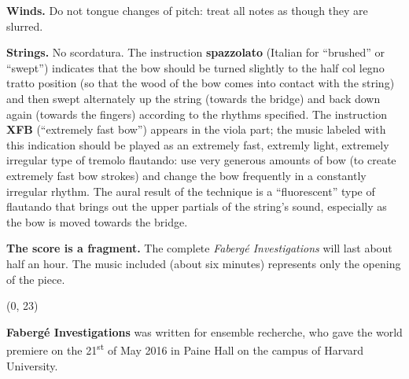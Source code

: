 \documentclass[10pt]{article}
\begin{document}
\begin{textblock}{23}
\textbf{Winds.} Do not tongue changes of pitch: treat all notes as though they
are slurred. 

\textbf{Strings.} No scordatura. The instruction \textbf{spazzolato} (Italian
for ``brushed'' or ``swept'') indicates that the bow should be turned slightly
to the half col legno tratto position (so that the wood of the bow comes into
contact with the string) and then swept alternately up the string (towards the
bridge) and back down again (towards the fingers) according to the rhythms
specified. The instruction \textbf{XFB} (``extremely fast bow'') appears in the
viola part; the music labeled with this indication should be played as an
extremely fast, extremly light, extremely irregular type of tremolo flautando:
use very generous amounts of bow (to create extremely fast bow strokes) and
change the bow frequently in a constantly irregular rhythm. The aural result of
the technique is a ``fluorescent'' type of flautando that brings out the upper
partials of the string's sound, especially as the bow is moved towards the
bridge.

\textbf{The score is a fragment.} The complete \textit{Faberg\'{e}
Investigations} will last about half an hour. The music included (about six
minutes) represents only the opening of the piece.

\end{textblock}

\begin{textblock}{23}(0, 23)

\textbf{Faberg\'{e} Investigations} was written for ensemble recherche, who
gave the world premiere on the 21\textsuperscript{st} of May 2016 in Paine Hall
on the campus of Harvard University.

\end{textblock}
\end{document}

